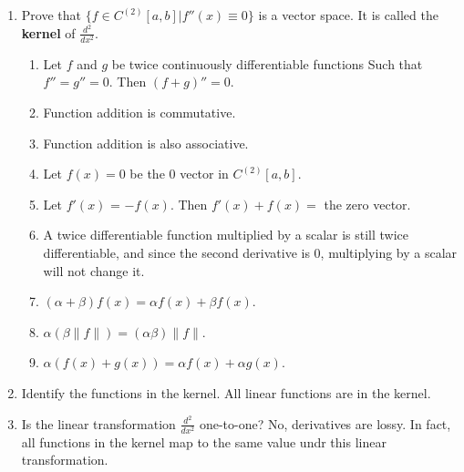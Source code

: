 \documentclass{article}
\begin{document}
\begin{enumerate}
\begin{enumerate}
\begin{proof}
                        \end{proof}
                  \item Prove that $\{f\in C^{(2)}[a,b]|f''(x)\equiv 0\}$
                        is a vector space. It is called the \textbf{kernel} of
                        $\frac{d^2}{dx^2}$.
                        \begin{enumerate}
                              \item Let $f$ and $g$ be twice continuously differentiable functions
                                    Such that $f''=g''=0$. Then $(f+g)''=0$.
                              \item Function addition is commutative.
                              \item Function addition is also associative.
                              \item Let $f(x)=0$ be the 0 vector in $C^{(2)}[a,b]$.
                              \item Let $f'(x)$ = $-f(x)$. Then $f'(x)+f(x)=$ the zero vector.
                              \item A twice differentiable function multiplied by a scalar is still twice differentiable,
                                    and since the second derivative is 0, multiplying by a scalar will not change it.
                              \item $(\alpha+\beta)f(x) = \alpha f(x) + \beta f(x)$.
                              \item $\alpha(\beta \lVert f\rVert) = (\alpha\beta) \lVert f\rVert$.
                              \item $\alpha (f(x)+g(x)) = \alpha f(x) + \alpha g(x)$.
                        \end{enumerate}
                  \item Identify the functions in the kernel.
                        \medbreak
                        All linear functions are in the kernel.
                  \item Is the linear transformation $\frac{d^2}{dx^2}$
                        one-to-one?
                        \medbreak
                        No, derivatives are lossy. In fact, all functions in the kernel map to
                        the same value undr this linear transformation.
            \end{enumerate}
\end{enumerate}
\end{document}
